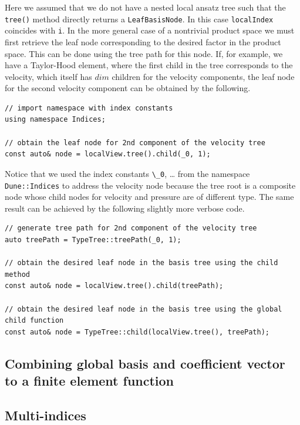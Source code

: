 \documentclass[a4paper,10pt,headings=normal,bibliography=totoc]{scrartcl}
\newcommand{\cpp}[1]{\lstinline[basicstyle=\ttfamily]!#1!}
\newcommand{\todograeser}[1]{\todo[inline,color=lightblue,author=CG]{#1}}
\begin{document}
Here we assumed that we do not have a nested local ansatz tree
such that the \cpp{tree()} method directly returns a \cpp{LeafBasisNode}.
In this case \cpp{localIndex} coincides with \cpp{i}.
In the more general case of a nontrivial product space
we must first retrieve the leaf node corresponding to
the desired factor in the product space. This can be done
using the tree path for this node. If, for example,
we have a Taylor-Hood element, where the first
child in the tree corresponds to the velocity,
which itself has $dim$ children for the velocity
components, the leaf node for the second velocity
component can be obtained by the following.

\begin{lstlisting}[style=Example]
// import namespace with index constants
using namespace Indices;

// obtain the leaf node for 2nd component of the velocity tree
const auto& node = localView.tree().child(_0, 1);
\end{lstlisting}

Notice that we used the index constants \cpp{\_0}, \dots{}
from the namespace \cpp{Dune::Indices}
to address the velocity node because the
tree root is a composite node whose child nodes
for velocity and pressure are of different type.
The same result can be achieved by the following
slightly more verbose code.

\begin{lstlisting}[style=Example]
// generate tree path for 2nd component of the velocity tree
auto treePath = TypeTree::treePath(_0, 1);

// obtain the desired leaf node in the basis tree using the child method
const auto& node = localView.tree().child(treePath);

// obtain the desired leaf node in the basis tree using the global child function
const auto& node = TypeTree::child(localView.tree(), treePath);
\end{lstlisting}

\subsection{Combining global basis and coefficient vector to a finite element function}
\todograeser{Write this section}

\subsection{Multi-indices}
\end{document}
